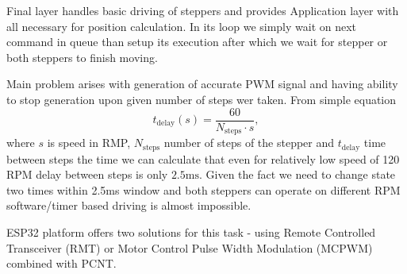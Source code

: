 Final layer handles basic driving of steppers and provides Application layer with all necessary for position calculation.
In its loop we simply wait on next command in queue than setup its execution after which we wait for stepper or both steppers to finish moving.

Main problem arises with generation of accurate PWM signal and having ability to stop generation upon given number of steps wer taken.
From simple equation
%
\begin{equation}
  t_{\mathrm{delay}}(s) = \frac{60}{N_{\mathrm{steps}} \cdot s},
  \label{eq:delay}
\end{equation}
%
where  $s$ is speed in RMP, $N_{\mathrm{steps}}$ number of steps of the stepper and  $t_{\mathrm{delay}}$ time between steps the time we can calculate that even for relatively low speed of 120 RPM delay between steps is only $2.5\mathrm{ms}$.
Given the fact we need to change state two times within 2.5ms window and both steppers can operate on different RPM software/timer based driving is almost impossible.


ESP32 platform offers two solutions for this task - using Remote Controlled Transceiver (RMT) or Motor Control Pulse Width Modulation (MCPWM) combined with PCNT.





\listoffigures

\listoftables

\clearpage
\openright

